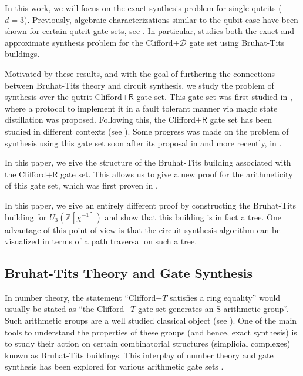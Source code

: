 \documentclass{eptcs}
\theoremstyle{remark}
\theoremstyle{definition}
\begin{document}
In this work, we will focus on the exact synthesis problem for single qutrits ($d = 3$). Previously, algebraic characterizations similar to the qubit case have been shown for certain qutrit gate sets, see \cite{Kalra2025synthesisarithmetic, evra2024arithmeticitycoveringrate9cyclotomic,kalra2024multiqutritexactsynthesis,Glaudell_2024,prakash2018normal}. In particular, \cite{evra2024arithmeticitycoveringrate9cyclotomic} studies both the exact and approximate synthesis problem for the Clifford$+\mathcal{D}$ gate set using Bruhat-Tits buildings.


Motivated by these results, and with the goal of furthering the connections between Bruhat-Tits theory and circuit synthesis, we study the problem of synthesis over the qutrit Clifford$+\mathsf{R}$ gate set. This gate set was first studied in \cite{anwar2012qutrit}, where a protocol to implement it in a fault tolerant manner via magic state distillation was proposed. Following this, the Clifford$+\mathsf{R}$ gate set has been studied in different contexts (see \cite{cui2015universal,yardapprox,Bocharov_2017,bocharov2016noteoptimalityquantumcircuits,glaudell_et_al:LIPIcs.TQC.2022.12}). Some progress was made on the problem of synthesis using this gate set soon after its proposal in \cite{vadymanyons} and more recently, in \cite{Kalra2025synthesisarithmetic,gustafson2025synthesis}.

In this paper, we give the structure of the Bruhat-Tits building associated with the Clifford$+\mathsf{R}$ gate set. This allows us to give a new proof for the arithmeticity of this gate set, which was first proven in \cite{Kalra2025synthesisarithmetic}. 

In this paper, we give an entirely different proof by constructing the Bruhat-Tits building for $U_{3}\left(\mathbb{Z}[\chi^{-1}]\right)$ and show that this building is in fact a tree. One advantage of this point-of-view is that the circuit synthesis algorithm can be visualized in terms of a path traversal on such a tree.
\subsection{Bruhat-Tits Theory and Gate Synthesis}
In number theory, the statement ``Clifford$+T$ satisfies a ring equality'' would usually be stated as ``the Clifford$+T$ gate set generates an S-arithmetic group''. Such arithmetic groups are a well studied classical object
(see \cite{borel1989finiteness, prasad1989volumes}). 
One of the main tools to understand the properties of these groups (and hence, exact synthesis) is to study their action on certain combinatorial structures (simplicial complexes) known as Bruhat-Tits buildings. This interplay of number theory and gate synthesis has been explored for various arithmetic gate sets \cite{kliuchnikov2024multiqubitcircuitsynthesishermitian, evra2024arithmeticitycoveringrate9cyclotomic, parzanchevski2018super,blackman2023fast,yardapprox}.
\end{document}
